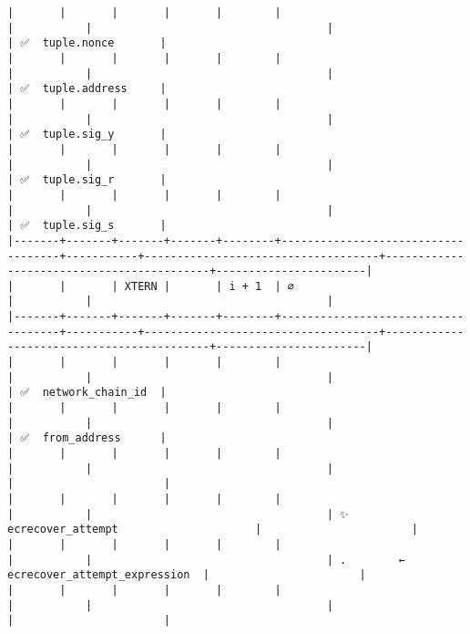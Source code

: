 \documentclass[varwidth=\maxdimen,margin=0.5cm,multi={verbatim}]{standalone}
\begin{document}
\begin{verbatim}
|       |       |       |       |        |                                    |           |                                    |                                           | ✅  tuple.nonce       |
|       |       |       |       |        |                                    |           |                                    |                                           | ✅  tuple.address     |
|       |       |       |       |        |                                    |           |                                    |                                           | ✅  tuple.sig_y       |
|       |       |       |       |        |                                    |           |                                    |                                           | ✅  tuple.sig_r       |
|       |       |       |       |        |                                    |           |                                    |                                           | ✅  tuple.sig_s       |
|-------+-------+-------+-------+--------+------------------------------------+-----------+------------------------------------+-------------------------------------------+-----------------------|
|       |       | XTERN |       | i + 1  | ∅                                  |           |                                    |
|-------+-------+-------+-------+--------+------------------------------------+-----------+------------------------------------+-------------------------------------------+-----------------------|
|       |       |       |       |        |                                    |           |                                    |                                           | ✅  network_chain_id  |
|       |       |       |       |        |                                    |           |                                    |                                           | ✅  from_address      |
|       |       |       |       |        |                                    |           |                                    |                                           |                       |
|       |       |       |       |        |                                    |           |                                    | ✨  ecrecover_attempt                     |                       |
|       |       |       |       |        |                                    |           |                                    | .        ←  ecrecover_attempt_expression  |                       |
|       |       |       |       |        |                                    |           |                                    |                                           |                       |

\end{verbatim}
\end{document}
